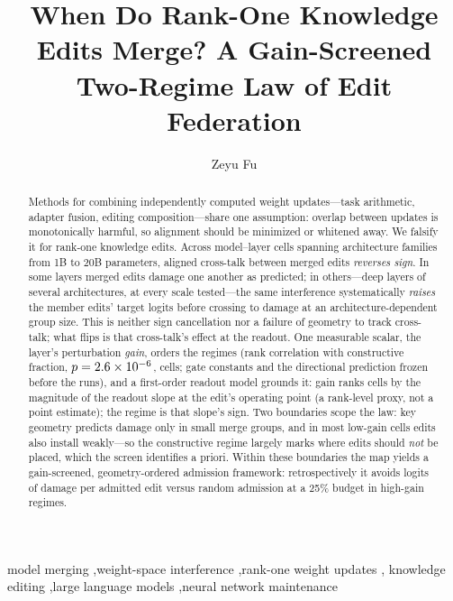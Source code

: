 \documentclass[preprint,12pt]{elsarticle}
\theoremstyle{definition}
\begin{document}
\begin{frontmatter}

\title{When Do Rank-One Knowledge Edits Merge? A Gain-Screened Two-Regime Law of Edit Federation}

\author[1]{Zeyu Fu}

\begin{abstract}
Methods for combining independently computed weight updates---task arithmetic, adapter
fusion, editing composition---share one assumption: overlap between updates is
monotonically harmful, so alignment should be minimized or whitened away. We falsify it
for rank-one knowledge edits. Across \nCells{} model--layer cells
spanning \nFamilies{} architecture families from 1B to 20B parameters, aligned cross-talk
between merged edits \emph{reverses sign}. In some layers merged edits damage one another
as predicted; in others---deep layers of several architectures, at every scale
tested---the same interference systematically \emph{raises} the member edits' target
logits before crossing to damage at an architecture-dependent group size. This is
neither sign cancellation nor a failure of
geometry to track cross-talk; what flips is that cross-talk's effect at the readout. One
measurable scalar, the layer's perturbation \emph{gain}, orders the regimes (rank
correlation \ordSpearman{} with constructive fraction, $p=2.6\times10^{-6}{}$, \nCells{}
cells; gate constants and the directional prediction frozen before the runs), and a
first-order readout model grounds it: gain ranks cells by the magnitude of the
readout slope at the edit's operating point (a rank-level proxy, not a point
estimate); the regime is that slope's sign. Two boundaries scope
the law: key geometry predicts damage only in small merge groups, and in most low-gain
cells edits also install weakly---so the constructive regime largely marks where edits
should \emph{not} be placed, which the screen identifies a priori. Within these
boundaries the map yields a gain-screened, geometry-ordered admission framework:
retrospectively it avoids \benefitHighQtwofive{} logits of damage per admitted edit
versus random admission at a 25\% budget in high-gain regimes.
\end{abstract}

\begin{keyword}
model merging \sep weight-space interference \sep rank-one weight updates \sep
knowledge editing \sep large language models \sep neural network maintenance
\end{keyword}
\end{frontmatter}
\end{document}
